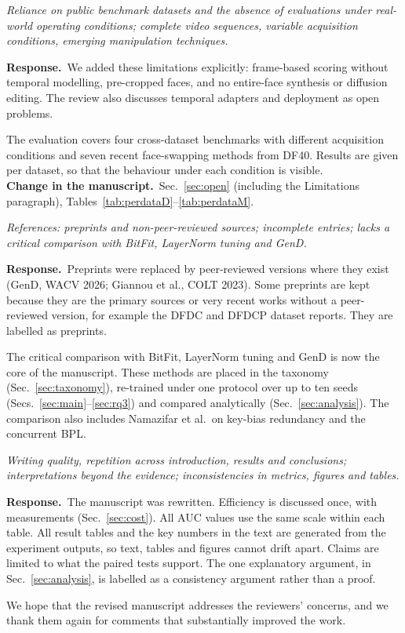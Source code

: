 \documentclass[11pt]{article}
\newenvironment{comment}{\par\medskip\noindent\begin{minipage}{\linewidth}\color{black!70}\itshape}{\end{minipage}\par\smallskip}
\newcommand{\resp}{\noindent\textbf{Response.}~}
\newcommand{\change}{\noindent\textbf{Change in the manuscript.}~}
\begin{document}
\begin{comment}
Reliance on public benchmark datasets and the absence of evaluations under real-world operating conditions; complete video sequences, variable acquisition conditions, emerging manipulation techniques.
\end{comment}
\resp We added these limitations explicitly: frame-based scoring without temporal modelling, pre-cropped faces, and no entire-face synthesis or diffusion editing. The review also discusses temporal adapters and deployment as open problems.

The evaluation covers four cross-dataset benchmarks with different acquisition conditions and seven recent face-swapping methods from DF40. Results are given per dataset, so that the behaviour under each condition is visible.\\
\change Sec.~\ref{sec:open} (including the Limitations paragraph), Tables~\ref{tab:perdataD}--\ref{tab:perdataM}.

\begin{comment}
References: preprints and non-peer-reviewed sources; incomplete entries; lacks a critical comparison with BitFit, LayerNorm tuning and GenD.
\end{comment}
\resp Preprints were replaced by peer-reviewed versions where they exist (GenD, WACV 2026; Giannou et al., COLT 2023). Some preprints are kept because they are the primary sources or very recent works without a peer-reviewed version, for example the DFDC and DFDCP dataset reports. They are labelled as preprints.

The critical comparison with BitFit, LayerNorm tuning and GenD is now the core of the manuscript. These methods are placed in the taxonomy (Sec.~\ref{sec:taxonomy}), re-trained under one protocol over up to ten seeds (Secs.~\ref{sec:main}--\ref{sec:rq3}) and compared analytically (Sec.~\ref{sec:analysis}). The comparison also includes Namazifar et al.\ on key-bias redundancy and the concurrent BPL.

\begin{comment}
Writing quality, repetition across introduction, results and conclusions; interpretations beyond the evidence; inconsistencies in metrics, figures and tables.
\end{comment}
\resp The manuscript was rewritten. Efficiency is discussed once, with measurements (Sec.~\ref{sec:cost}). All AUC values use the same scale within each table. All result tables and the key numbers in the text are generated from the experiment outputs, so text, tables and figures cannot drift apart. Claims are limited to what the paired tests support. The one explanatory argument, in Sec.~\ref{sec:analysis}, is labelled as a consistency argument rather than a proof.

\bigskip
\noindent We hope that the revised manuscript addresses the reviewers' concerns, and we thank them again for comments that substantially improved the work.
\end{document}

